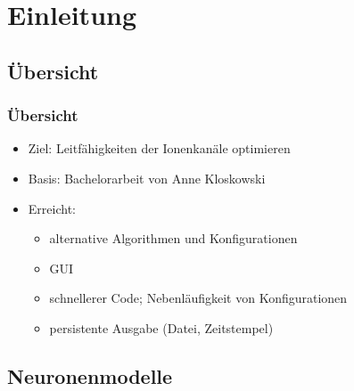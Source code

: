 \section{Einleitung}

\subsection{Übersicht}

\begin{frame}
  \frametitle{Übersicht}
  \begin{itemize}
  \item Ziel: Leitfähigkeiten der Ionenkanäle optimieren
  \item Basis: Bachelorarbeit von Anne Kloskowski
  \item Erreicht:
    \begin{itemize}
    \item alternative Algorithmen und Konfigurationen
    \item GUI
    \item schnellerer Code; Nebenläufigkeit von Konfigurationen
    \item persistente Ausgabe (Datei, Zeitstempel)
    \end{itemize}
  \end{itemize}
\end{frame}


\subsection{Neuronenmodelle}

